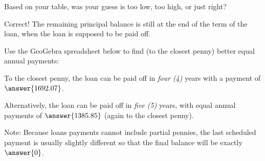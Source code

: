 \documentclass[handout,space,nooutcomes]{ximera}
\begin{document}
\begin{question}
Based on your table, was your guess is too low, too high, or just
right?  
\begin{multipleChoice}
\end{multipleChoice}
\vfill
\begin{question}
Correct!  The remaining principal balance is still  at the end of the term of the loan, when the loan is supposed to be paid off.  

Use the GeoGebra spreadsheet below to find (to the closest penny) better equal annual payments: 
\begin{center}
\end{center}
To the closest penny, the loan can be paid off in \emph{four (4)} years with a payment of $\answer{1692.07}$.  

Alternatively, the loan can be paid off in \emph{five (5)} years, with equal annual payments of $\answer{1385.85}$ (again to the closest penny).  

Note: Because loans payments cannot include partial pennies, the last scheduled payment is usually slightly different so that the final balance will be exactly $\answer{0}$.  
\end{question}
\end{question}
\end{document}
